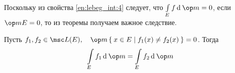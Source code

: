 Поскольку из свойства \ref{en:lebeg_int:4} следует, что $ \int\limits_E f \di \op m = 0 $, если $ \op m E = 0 $, то из теоремы получаем важное следствие.

\begin{implication}
	Пусть $ f_1, f_2 \in \msc L(E), \quad \op m \set{x \in E \mid f_1(x) \ne f_2(x)} = 0 $. Тогда
	$$ \int\limits_E f_1 \di \op m = \int\limits_E f_2 \di \op m $$
\end{implication}
